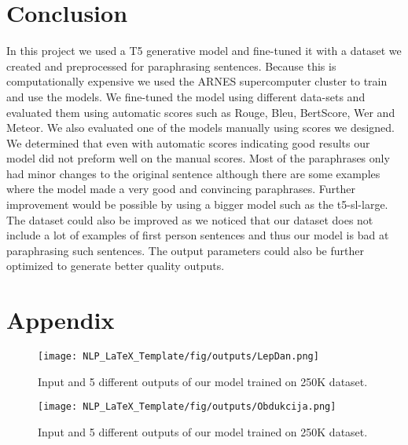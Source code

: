 \documentclass[fleqn,moreauthors,10pt]{ds_report}
\begin{document}
\section{Conclusion}

In this project we used a T5 generative model and fine-tuned it with a dataset we created and preprocessed for paraphrasing sentences. Because this is computationally expensive we used the ARNES supercomputer cluster to train and use the models. We fine-tuned the model using different data-sets and evaluated them using automatic scores such as Rouge, Bleu, BertScore, Wer and Meteor. We also evaluated one of the models manually using scores we designed. We determined that even with automatic scores indicating good results our model did not preform well on the manual scores. Most of the paraphrases only had minor changes to the original sentence although there are some examples where the model made a very good and convincing paraphrases. Further improvement would be possible by using a bigger model such as the t5-sl-large. The dataset could also be improved as we noticed that our dataset does not include a lot of examples of first person sentences and thus our model is bad at paraphrasing such sentences. The output parameters could also be further optimized to generate better quality outputs.





\newpage
\onecolumn

\section{Appendix}
\label{sec:appendix}
\begin{figure}[H]
    \centering
    \texttt{[image: NLP\_LaTeX\_Template/fig/outputs/LepDan.png]}
    \caption{Input and 5 different outputs of our model trained on 250K dataset. }
    \label{fig:output1}
\end{figure}

\begin{figure}[H]
    \centering
    \texttt{[image: NLP\_LaTeX\_Template/fig/outputs/Obdukcija.png]}
    \caption{Input and 5 different outputs of our model trained on 250K dataset. }
    \label{fig:output2}
\end{figure}
\end{document}
